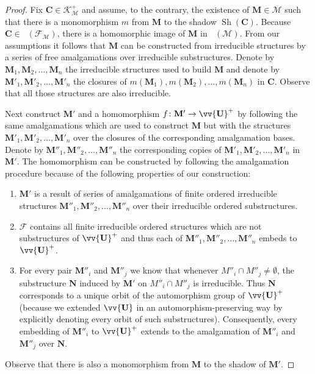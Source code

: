 \documentclass{elsarticle}
\def\Forb{\mathop{\mathrm{Forb_{he}}}\nolimits}
\def\Forbm{\mathop{\mathrm{Forb_m}}\nolimits}
\def\sh{\mathop{\mathrm{Sh}}\nolimits}
\def\str#1{\mathbf {#1}}
\def\K{{\mathcal K}}
\theoremstyle{plain}
\theoremstyle{definition}
\theoremstyle{remark}
\begin{document}
\begin{proof}
Fix $\str{C}\in \K^+_\mathcal M$ and assume, to the contrary, the existence of $\str{M}\in \mathcal M$ such that there is a monomorphism $m$ from $\str{M}$ to the shadow $\sh(\str{C})$.
Because $\str{C}\in \Forb(\mathcal F_\mathcal M)$, there is a homomorphic image of $\str{M}$  in $\Forbm(\mathcal M)$. From our assumptions it follows that $\str{M}$ can be constructed from irreducible structures by a series of free amalgamations over irreducible substructures.  Denote by $\str{M}_1, \str{M}_2, \ldots, \str{M}_n$ the irreducible structures used to build $\str{M}$ and denote by $\str{M}'_1, \str{M}'_2, \ldots, \str{M}'_n$
the closures of $m(\str{M}_1), m(\str{M}_2),\allowbreak \ldots,\allowbreak m(\str{M}_n)$ in $\str{C}$. Observe that all those structures are also irreducible.

Next construct $\str{M}'$ and a homomorphism $f\colon \str{M}'\to \vv{\str{U}}^+$ by following the same amalgamations which are used to construct $\str{M}$ but with the structures $\str{M}'_1, \str{M}'_2, \ldots, \str{M}'_n$ over the closures of the corresponding amalgamation bases.
Denote by $\str{M}''_1, \str{M}''_2, \ldots, \str{M}''_n$ the corresponding copies of $\str{M}'_1, \str{M}'_2, \ldots, \str{M}'_n$ in $\str{M}'$.
The homomorphism can be constructed by following the amalgamation procedure because of the following properties of our construction:
\begin{enumerate}
\item $\str{M}'$ is a result of series of amalgamations of finite ordered irreducible structures $\str{M}''_1,\allowbreak  \str{M}''_2,\allowbreak  \ldots,\allowbreak  \str{M}''_n$ over their irreducible ordered substructures.
\item $\mathcal F$ contains all finite irreducible ordered structures which are not substructures of $\vv{\str{U}}^+$ and thus each of $\str{M}''_1, \str{M}''_2, \ldots, \str{M}''_n$ embeds to $\vv{\str{U}}^+$.
\item For every pair $\str{M}''_i$ and $\str{M}''_j$ we know that whenever $M''_i\cap M''_j\neq \emptyset$, the substructure $\str{N}$ induced by $\str{M}'$ on  $M''_i\cap M''_j$ is irreducible.
Thus $\str{N}$ corresponds to a unique orbit of the automorphism group of $\vv{\str{U}}^+$ (because we extended $\vv{\str{U}}$ in an automorphism-preserving way by explicitly denoting every orbit of such substructures).
Consequently, every embedding of $\str{M}''_i$ to $\vv{\str{U}}^+$ extends to the amalgamation of $\str{M}''_i$ and $\str{M}''_j$ over $\str{N}$.
\end{enumerate}
Observe that there is also a monomorphism from $\str{M}$ to the shadow of $\str{M}'$.


\end{proof}
\end{document}
